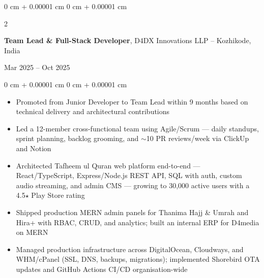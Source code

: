 \documentclass[10pt, a4paper]{article}
\newenvironment{highlights}{
    \begin{itemize}[
        topsep=0.08 cm,
        parsep=0.06 cm,
        partopsep=0pt,
        itemsep=0pt,
        leftmargin=0 cm + 10pt
    ]
}{
    \end{itemize}
}
\newenvironment{onecolentry}{
    \begin{adjustwidth}{
        0 cm + 0.00001 cm
    }{
        0 cm + 0.00001 cm
    }
}{
    \end{adjustwidth}
}
\newenvironment{twocolentry}[2][]{
    \onecolentry
    \def\secondColumn{#2}
    \setcolumnwidth{\fill, 4.8 cm}
    \begin{paracol}{2}
}{
    \switchcolumn \raggedleft \secondColumn
    \end{paracol}
    \endonecolentry}
\begin{document}
    \vspace{0.15 cm}

    \begin{twocolentry}{
        Mar 2025 -- Oct 2025
    }
        \textbf{Team Lead \& Full-Stack Developer}, D4DX Innovations LLP -- Kozhikode, India
    \end{twocolentry}
    \vspace{0.08 cm}
    \begin{onecolentry}
        \begin{highlights}
            \item Promoted from Junior Developer to Team Lead within 9 months based on technical delivery and architectural contributions
            \item Led a 12-member cross-functional team using Agile/Scrum --- daily standups, sprint planning, backlog grooming, and $\sim$10 PR reviews/week via ClickUp and Notion
            \item Architected Tafheem ul Quran web platform end-to-end --- React/TypeScript, Express/Node.js REST API, SQL with auth, custom audio streaming, and admin CMS --- growing to 30,000 active users with a 4.5$\star$ Play Store rating
            \item Shipped production MERN admin panels for Thanima Hajj \& Umrah and Hira+ with RBAC, CRUD, and analytics; built an internal ERP for D4media on MERN
            \item Managed production infrastructure across DigitalOcean, Cloudways, and WHM/cPanel (SSL, DNS, backups, migrations); implemented Shorebird OTA updates and GitHub Actions CI/CD organisation-wide
        \end{highlights}
    \end{onecolentry}

    \vspace{0.15 cm}
\end{document}
